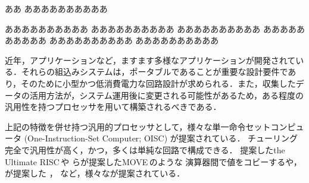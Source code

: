 \documentclass[12pt,landscape]{ltjtarticle}
\begin{document}
ああ%
ああああああああああ


ああああああああああ
ああああああああああ
ああああああああああ
ああああああああああ
ああああああああああ
ああああああああああ

近年，アプリケーションなど，ますます多様なアプリケーションが開発されている．それらの組込みシステムは，ポータブルであることが重要な設計要件であり，そのために小型かつ低消費電力な回路設計が求められる．また，収集したデータの活用方法が，システム運用後に変更される可能性があるため，ある程度の汎用性を持つプロセッサを用いて構築されるべきである．

上記の特徴を併せ持つ汎用的プロセッサとして，様々な単一命令セットコンピュータ (One-Instruction-Set Computer; OISC) が提案されている．
チューリング完全で汎用性が高く，かつ，多くは単純な回路で構成できる．
提案した\JAspace the Ultimate RISC\,\cite{Jones1988}\AJspace や
らが提案した\JAspace MOVE\,\cite{Corporaal1991,Corporaal1993}\AJspace のような
演算器間で値をコビーするや，%
が提案した%
\cite{Mazonka2009}，
など，様々なが提案されている．
\end{document}
